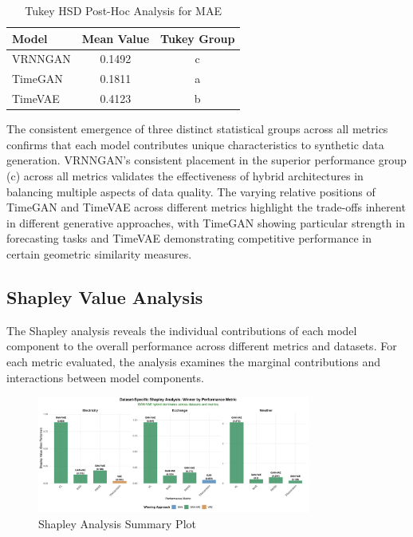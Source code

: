 \documentclass{article}
\begin{document}
\begin{table}[H]
\centering
\caption{Tukey HSD Post-Hoc Analysis for MAE}
\label{tab:tukey_mae}
\begin{tabular}{lcc}
\toprule
\textbf{Model} & \textbf{Mean Value} & \textbf{Tukey Group} \\
\midrule
VRNNGAN & 0.1492 & c \\
TimeGAN & 0.1811 & a \\
TimeVAE & 0.4123 & b \\
\bottomrule
\end{tabular}
\footnotesize
\end{table}

The consistent emergence of three distinct statistical groups across all metrics confirms that each model contributes unique characteristics to synthetic data generation. VRNNGAN's consistent placement in the superior performance group (c) across all metrics validates the effectiveness of hybrid architectures in balancing multiple aspects of data quality. The varying relative positions of TimeGAN and TimeVAE across different metrics highlight the trade-offs inherent in different generative approaches, with TimeGAN showing particular strength in forecasting tasks and TimeVAE demonstrating competitive performance in certain geometric similarity measures.

\subsection{Shapley Value Analysis}
The Shapley analysis reveals the individual contributions of each model component to the overall performance across different metrics and datasets. For each metric evaluated, the analysis examines the marginal contributions and interactions between model components.


\begin{figure}[H]
\centering
\includegraphics[width=0.8\textwidth]{assets/shapley_dataset_winners.png}
\caption{Shapley Analysis Summary Plot}
\label{fig:shap}
\end{figure}
\end{document}
